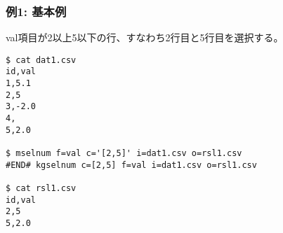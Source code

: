 
\subsubsection*{例1: 基本例}

val項目が2以上5以下の行、すなわち2行目と5行目を選択する。

\begin{Verbatim}[baselinestretch=0.7,frame=single]
$ cat dat1.csv
id,val
1,5.1
2,5
3,-2.0
4,
5,2.0

$ mselnum f=val c='[2,5]' i=dat1.csv o=rsl1.csv
#END# kgselnum c=[2,5] f=val i=dat1.csv o=rsl1.csv

$ cat rsl1.csv
id,val
2,5
5,2.0
\end{Verbatim}
